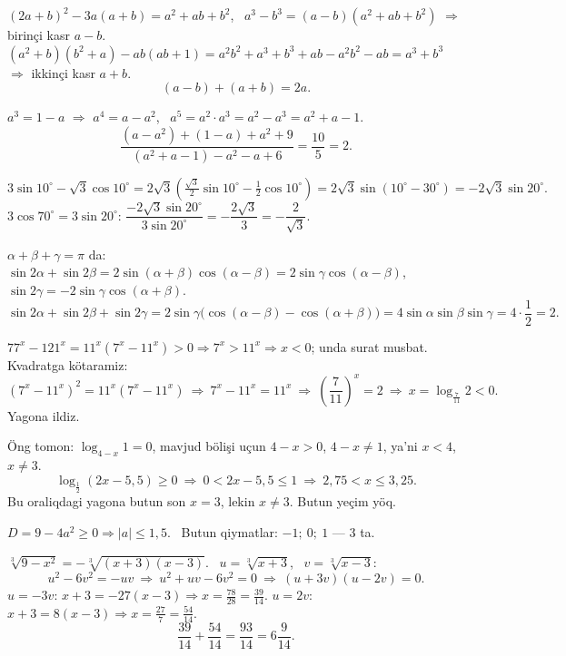 $(2a+b)^2-3a(a+b)=a^2+ab+b^2$, \ $a^3-b^3=(a-b)(a^2+ab+b^2)$ $\Rightarrow$ birinçi kasr $a-b$.\\
$(a^2+b)(b^2+a)-ab(ab+1)=a^2b^2+a^3+b^3+ab-a^2b^2-ab=a^3+b^3$ $\Rightarrow$ ikkinçi kasr $a+b$.
\[(a-b)+(a+b)=2a.\]

$a^3=1-a$ $\Rightarrow$ $a^4=a-a^2$, \ $a^5=a^2\cdot a^3=a^2-a^3=a^2+a-1$.
\[\frac{(a-a^2)+(1-a)+a^2+9}{(a^2+a-1)-a^2-a+6}=\frac{10}5=2.\]

\[3\sin10^\circ-\sqrt3\cos10^\circ=2\sqrt3\left(\tfrac{\sqrt3}2\sin10^\circ-\tfrac12\cos10^\circ\right)=2\sqrt3\sin(10^\circ-30^\circ)=-2\sqrt3\sin20^\circ.\]
$3\cos70^\circ=3\sin20^\circ$: \quad $\dfrac{-2\sqrt3\sin20^\circ}{3\sin20^\circ}=-\dfrac{2\sqrt3}3=-\dfrac2{\sqrt3}$.

$\alpha+\beta+\gamma=\pi$ da: \ $\sin2\alpha+\sin2\beta=2\sin(\alpha+\beta)\cos(\alpha-\beta)=2\sin\gamma\cos(\alpha-\beta)$, \ $\sin2\gamma=-2\sin\gamma\cos(\alpha+\beta)$.
\[\sin2\alpha+\sin2\beta+\sin2\gamma=2\sin\gamma\bigl(\cos(\alpha-\beta)-\cos(\alpha+\beta)\bigr)=4\sin\alpha\sin\beta\sin\gamma=4\cdot\frac12=2.\]

$77^x-121^x=11^x(7^x-11^x)>0\Rightarrow 7^x>11^x\Rightarrow x<0$; unda surat musbat. Kvadratga kötaramiz:
\[(7^x-11^x)^2=11^x(7^x-11^x)\ \Rightarrow\ 7^x-11^x=11^x\ \Rightarrow\ \left(\frac7{11}\right)^x=2\ \Rightarrow\ x=\log_{\frac7{11}}2<0.\]
Yagona ildiz.

Öng tomon: $\log_{4-x}1=0$, mavjud bölişi uçun $4-x>0$, $4-x\ne1$, ya'ni $x<4$, $x\ne3$.
\[\log_{\frac12}\left(2x-5{,}5\right)\ge0\ \Rightarrow\ 0<2x-5{,}5\le1\ \Rightarrow\ 2{,}75<x\le3{,}25.\]
Bu oraliqdagi yagona butun son $x=3$, lekin $x\ne3$. Butun yeçim yöq.

$D=9-4a^2\ge0\Rightarrow |a|\le1{,}5$. \ Butun qiymatlar: $-1;\ 0;\ 1$ — 3 ta.

$\sqrt[3]{9-x^2}=-\sqrt[3]{(x+3)(x-3)}$. \ $u=\sqrt[3]{x+3}$, \ $v=\sqrt[3]{x-3}$:
\[u^2-6v^2=-uv\ \Rightarrow\ u^2+uv-6v^2=0\ \Rightarrow\ (u+3v)(u-2v)=0.\]
$u=-3v$: $x+3=-27(x-3)\Rightarrow x=\frac{78}{28}=\frac{39}{14}$. \quad $u=2v$: $x+3=8(x-3)\Rightarrow x=\frac{27}7=\frac{54}{14}$.
\[\frac{39}{14}+\frac{54}{14}=\frac{93}{14}=6\frac9{14}.\]

